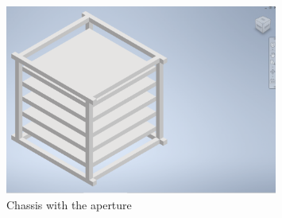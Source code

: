 \begin{figure}[htbp]
\centering
\includegraphics[width=0.8\textwidth]{chapters/methodology/CubeSatDesign/Fig6CAD.png}
\caption{Chassis with the aperture}
\label{fig:cubesat-chassis2-with-aperture}
\end{figure}